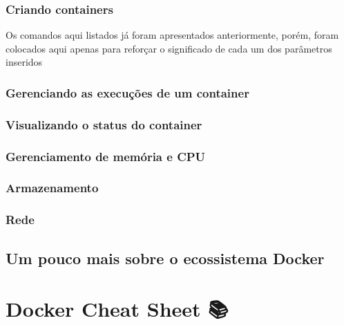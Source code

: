 \documentclass[]{article}
\begin{document}
\hypertarget{criando-containers}{%
\subsubsection{Criando containers}\label{criando-containers}}

Os comandos aqui listados já foram apresentados anteriormente, porém, foram colocados aqui apenas para reforçar o significado de cada um dos parâmetros inseridos

\hypertarget{gerenciando-as-execucoes-de-um-container}{%
\subsubsection{Gerenciando as execuções de um container}\label{gerenciando-as-execucoes-de-um-container}}

\hypertarget{visualizando-o-status-do-container}{%
\subsubsection{Visualizando o status do container}\label{visualizando-o-status-do-container}}

\hypertarget{gerenciamento-de-memoria-e-cpu}{%
\subsubsection{Gerenciamento de memória e CPU}\label{gerenciamento-de-memoria-e-cpu}}

\hypertarget{armazenamento}{%
\subsubsection{Armazenamento}\label{armazenamento}}

\hypertarget{rede}{%
\subsubsection{Rede}\label{rede}}

\hypertarget{um-pouco-mais-sobre-o-ecossistema-docker}{%
\subsection{Um pouco mais sobre o ecossistema Docker 🐙}\label{um-pouco-mais-sobre-o-ecossistema-docker}}

\hypertarget{docker-cheat-sheet}{%
\section{Docker Cheat Sheet 📚}\label{docker-cheat-sheet}}
\end{document}
